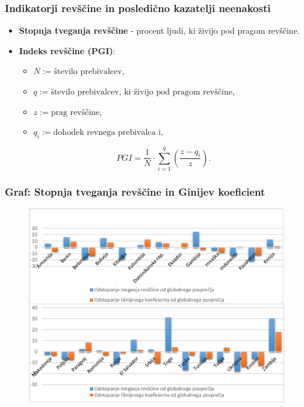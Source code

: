 \documentclass[10pt]{beamer}
\begin{document}
\begin{frame}
\frametitle{Indikatorji revščine in posledično kazatelji neenakosti}
\begin{itemize}
\item \textbf{Stopnja tveganja revščine} - procent ljudi, ki živijo pod pragom revščine.

\item \textbf{Indeks revščine (PGI)}:
\begin{itemize}
\item $N := \textrm{število prebivalcev}$,
\item $q := \textrm{število prebivalcev, ki živijo pod pragom revščine}$,
\item $z := \textrm{prag revščine}$,
\item $q_i := \textrm{dohodek revnega prebivalca i}$,
\end{itemize}
$$
PGI = \frac{1}{N} \cdot \sum_{i=1}^q (\frac{z-q_i}{z}).
$$
\end{itemize}
\end{frame}


\begin{frame}
\frametitle{Graf: Stopnja tveganja revščine in Ginijev koeficient}
\begin{figure}
\includegraphics[scale = 0.76]{./slike/gini_revscina.png}
\end{figure}

\end{frame}
\end{document}
